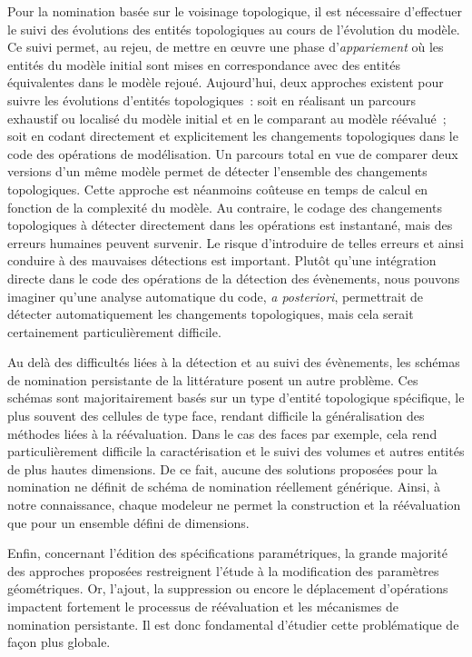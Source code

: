Pour la nomination basée sur le voisinage topologique, il est nécessaire
d'effectuer le suivi des évolutions des entités topologiques au cours de
l'évolution du modèle. %
Ce suivi permet, au rejeu, de mettre en \oe uvre une phase d'\emph{appariement}
où les entités du modèle initial sont mises en correspondance avec des entités
équivalentes dans le modèle rejoué. %
Aujourd'hui, deux approches existent pour suivre les évolutions d'entités topologiques~: %
soit en réalisant un parcours exhaustif ou localisé du modèle initial et en le comparant au modèle réévalué~; soit en codant directement et explicitement les changements topologiques dans le code des opérations de modélisation. %
Un parcours total en vue de comparer deux versions d'un même modèle permet de détecter
l'ensemble des changements topologiques. %
Cette approche est néanmoins coûteuse en temps de calcul en fonction de la complexité du modèle. %
Au contraire, le codage des changements topologiques à détecter directement
dans les opérations est instantané, mais des erreurs humaines peuvent
survenir. %
Le risque d'introduire de telles erreurs et ainsi conduire à des mauvaises
détections est important. %
Plutôt qu'une intégration directe dans le code des opérations de la détection des
évènements, nous pouvons imaginer qu'une analyse automatique du code, \textit{a posteriori},
permettrait de détecter automatiquement les changements topologiques, mais cela serait
certainement particulièrement difficile.

Au delà des difficultés liées à la détection et au suivi des évènements, les schémas de nomination persistante
de la littérature posent un autre problème. %
Ces schémas sont majoritairement basés sur un type d'entité topologique spécifique, le plus souvent des
cellules de type face, rendant difficile la généralisation des méthodes liées à la réévaluation. %
Dans le cas des faces par exemple, cela rend particulièrement difficile la caractérisation
et le suivi des volumes et autres entités de plus hautes dimensions. %
De ce fait, aucune des solutions proposées pour la nomination ne définit de schéma de nomination réellement générique. %
Ainsi, à notre connaissance, chaque modeleur ne permet la construction et la réévaluation que pour un
ensemble défini de dimensions.

Enfin, concernant l'édition des spécifications paramétriques,
la grande majorité des approches proposées restreignent l'étude à la modification des paramètres géométriques. Or, l'ajout, la suppression ou encore le déplacement d'opérations impactent fortement le processus de réévaluation et les mécanismes de nomination persistante. Il est donc fondamental d'étudier cette problématique de façon plus globale.

